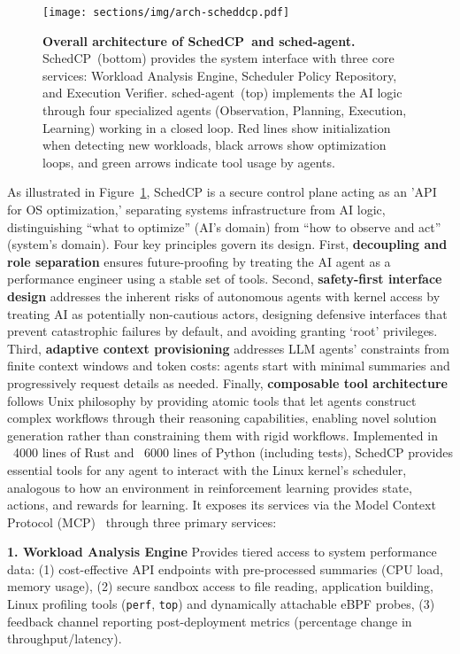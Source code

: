 \documentclass[preprint]{article}
\newcommand{\sys}{SchedCP\xspace}
\newcommand{\agent}{sched-agent\xspace}
\begin{document}
\begin{figure}
    \centering
    \texttt{[image: sections/img/arch-scheddcp.pdf]}
    \caption{
        \textbf{Overall architecture of \sys\ and \agent.} 
        \sys\ (bottom) provides the system interface with three core services: Workload Analysis Engine, Scheduler Policy Repository, and Execution Verifier.
        \agent\ (top) implements the AI logic through four specialized agents (Observation, Planning, Execution, Learning) working in a closed loop. Red lines show initialization when detecting new workloads, black arrows show optimization loops, and green arrows indicate tool usage by agents.
    }
    \label{fig:frameworkarch}
\end{figure}

As illustrated in Figure~\ref{fig:frameworkarch}, \sys is a secure control plane acting as an 'API for OS optimization,' separating systems infrastructure from AI logic, distinguishing ``what to optimize'' (AI's domain) from ``how to observe and act'' (system's domain). Four key principles govern its design. First, \textbf{decoupling and role separation} ensures future-proofing by treating the AI agent as a performance engineer using a stable set of tools. Second, \textbf{safety-first interface design} addresses the inherent risks of autonomous agents with kernel access by treating AI as potentially non-cautious actors, designing defensive interfaces that prevent catastrophic failures by default, and avoiding granting `root' privileges. Third, \textbf{adaptive context provisioning} addresses LLM agents' constraints from finite context windows and token costs: agents start with minimal summaries and progressively request details as needed. Finally, \textbf{composable tool architecture} follows Unix philosophy by providing atomic tools that let agents construct complex workflows through their reasoning capabilities, enabling novel solution generation rather than constraining them with rigid workflows. Implemented in ~4000 lines of Rust and ~6000 lines of Python (including tests), \sys provides essential tools for any agent to interact with the Linux kernel's scheduler, analogous to how an environment in reinforcement learning provides state, actions, and rewards for learning. It exposes its services via the Model Context Protocol (MCP)~\cite{anthropic2024mcp} through three primary services:


\textbf{1. Workload Analysis Engine} Provides tiered access to system performance data: (1) cost-effective API endpoints with pre-processed summaries (CPU load, memory usage), (2) secure sandbox access to file reading, application building, Linux profiling tools (\texttt{perf}, \texttt{top}) and dynamically attachable eBPF probes, (3) feedback channel reporting post-deployment metrics (percentage change in throughput/latency).
\end{document}

